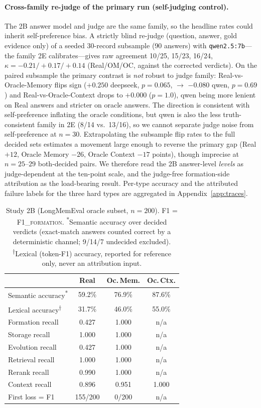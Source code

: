 \documentclass[11pt]{article}
\newcommand{\fone}{F1\textsc{\_formation}}
\begin{document}
\paragraph{Cross-family re-judge of the primary run (self-judging
control).}
The 2B answer model and judge are the same family, so the headline
rates could inherit self-preference bias. A strictly blind re-judge
(question, answer, gold evidence only) of a seeded 30-record subsample
(90 answers) with \texttt{qwen2.5:7b}---the family 2E calibrates---gives
raw agreement 10/25, 15/23, 16/24, $\kappa{=}{-}0.21/{+}0.17/{+}0.14$
(Real/OM/OC, against the corrected verdicts). On the paired subsample
the primary contrast is \emph{not} robust to judge family:
Real-vs-Oracle-Memory flips sign ($+0.250$ deepseek, $p{=}0.065$,
$\to$ $-0.080$ qwen, $p{=}0.69$) and Real-vs-Oracle-Context drops
to $+0.000$ ($p{=}1.0$), qwen being more lenient on Real answers
and stricter on oracle answers. The direction is consistent with
self-preference inflating the oracle conditions, but qwen is also the
less truth-consistent family in 2E (8/14 vs.\ 13/16), so we cannot
separate judge noise from self-preference at $n{=}30$. Extrapolating
the subsample flip rates to the full decided sets estimates a movement
large enough to reverse the primary gap (Real $+12$, Oracle Memory
$-26$, Oracle Context $-17$ points), though imprecise at $n{=}25$--$29$
both-decided pairs. We therefore read the 2B answer-level \emph{levels}
as judge-dependent at the ten-point scale, and the judge-free
formation-side attribution as the load-bearing result. Per-type accuracy
and the attributed failure labels for the three hard types are aggregated
in Appendix~\ref{app:traces}.

\begin{table}[!t]
\centering\footnotesize
\setlength{\tabcolsep}{4pt}
\begin{tabular}{lccc}
\toprule
 & \textbf{Real} & \textbf{Oc.\,Mem.} & \textbf{Oc.\,Ctx.} \\
\midrule
Semantic accuracy\textsuperscript{*} & 59.2\% & 76.9\% & 87.6\% \\
Lexical accuracy\textsuperscript{†} & 31.7\% & 46.0\% & 55.0\% \\
\midrule
Formation recall & 0.427 & 1.000 & n/a \\
Storage recall & 1.000 & 1.000 & n/a \\
Evolution recall & 0.427 & 1.000 & n/a \\
Retrieval recall & 1.000 & 1.000 & n/a \\
Rerank recall & 0.990 & 1.000 & n/a \\
Context recall & 0.896 & 0.951 & 1.000 \\
\midrule
First loss = F1 & 155/200 & 0/200 & n/a \\
\bottomrule
\end{tabular}
\caption{Study 2B (LongMemEval oracle subset, $n{=}200$). F1 = \fone{}.
\textsuperscript{*}Semantic accuracy over decided verdicts (exact-match
answers counted correct by a deterministic channel; 9/14/7 undecided
excluded). \textsuperscript{†}Lexical (token-F1) accuracy, reported for
reference only, never an attribution input.}
\label{tab:2b}
\end{table}
\end{document}

